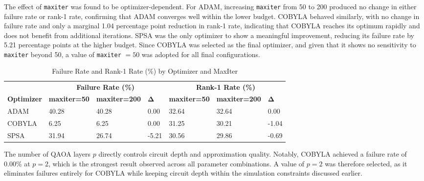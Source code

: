 \documentclass[a4paper]{report}
\begin{document}
{\begin{itemize}
\begin{itemize}
The effect of \texttt{maxiter} was found to be optimizer-dependent. For ADAM, 
increasing \texttt{maxiter} from 50 to 200 produced no change in either failure 
rate or rank-1 rate, confirming that ADAM converges well within the lower budget. 
COBYLA behaved similarly, with no change in failure rate and only a marginal 
1.04 percentage point reduction in rank-1 rate, indicating that COBYLA reaches 
its optimum rapidly and does not benefit from additional iterations. SPSA was the 
only optimizer to show a meaningful improvement, reducing its failure rate by 5.21 
percentage points at the higher budget. Since COBYLA was selected as the final 
optimizer, and given that it shows no sensitivity to \texttt{maxiter} beyond 50, 
a value of \texttt{maxiter} $= 50$ was adopted for all final configurations.

\begin{table}[!ht]
\centering
\begin{tabular}{@{}lllllll@{}}
\toprule
 & \multicolumn{3}{c}{\textbf{Failure Rate (\%)}} & 
   \multicolumn{3}{c}{\textbf{Rank-1 Rate (\%)}} \\ 
\cmidrule(lr){2-4} \cmidrule(lr){5-7}
\textbf{Optimizer} & \textbf{maxiter=50} & \textbf{maxiter=200} & 
$\boldsymbol{\Delta}$ & \textbf{maxiter=50} & \textbf{maxiter=200} & 
$\boldsymbol{\Delta}$ \\ \midrule
ADAM   & 40.28 & 40.28 & 0.00  & 32.64 & 32.64 & 0.00  \\
COBYLA & 6.25  & 6.25  & 0.00  & 31.25 & 30.21 & -1.04 \\
SPSA   & 31.94 & 26.74 & -5.21 & 30.56 & 29.86 & -0.69 \\ \bottomrule
\end{tabular}
\caption{Failure Rate and Rank-1 Rate (\%) by Optimizer and MaxIter}
\label{tab:optimizer-maxiter}
\end{table}

The number of QAOA layers $p$ directly controls circuit depth and approximation 
quality. Notably, COBYLA achieved a failure rate of 0.00\% at $p = 2$, which is 
the strongest result observed across all parameter combinations. A value of 
$p = 2$ was therefore selected, as it eliminates failures entirely for COBYLA 
while keeping circuit depth within the simulation constraints discussed earlier.


\end{itemize}
\end{itemize}}
\end{document}
